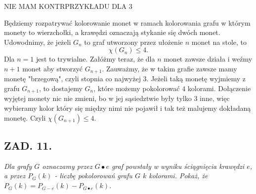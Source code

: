 \documentclass{article}
\begin{document}

{\color{def}NIE MAM KONTRPRZYKŁADU DLA 3}
\bigskip

Będziemy rozpatrywać kolorowanie monet w ramach kolorowania grafu w którym monety to wierzchołki, a krawędzi oznaczają stykanie się dwóch monet. Udowodnimy, że jeżeli $G_n$ to graf utworzony przez ułożenie $n$ monet na stole, to
$$\chi(G_n)\leq4.$$
Dla $n=1$ jest to trywialne. Załóżmy teraz, że dla $n$ monet zawsze działa i weźmy $n+1$ monet aby stworzyć $G_{n+1}$. Zauważmy, że w takim grafie zawsze mamy monetę "brzegową", czyli stopnia co najwyżej $3$. Jeżeli taką monetę wyjmiemy z grafu $G_{n+1}$, to dostajemy $G_n$, które możemy pokolorować $4$ kolorami. Dołączenie wyjętej monety nic nie zmieni, bo w jej sąsiedztwie były tylko $3$ inne, więc wybieramy kolor który się między nimi nie pojawił i tak też malujemy dokładaną monetę. Czyli $\chi(G_{n+1})\leq 4$.

\subsection*{ZAD. 11.}
\emph{Dla grafy $G$ oznaczamy przez $G\bullet e$ graf powstały w wyniku ściągnięcia krawędzi $e$, a przez $P_G(k)$ - liczbę pokolorowań grafu $G$ $k$ kolorami. Pokaż, że $P_G(k)=P_{G-e}(k)-P_{G\bullet e}(k)$.}
\medskip
\end{document}
